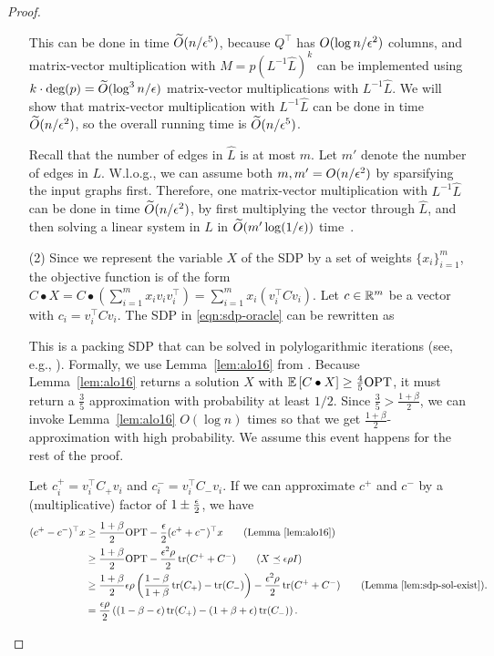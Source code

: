 \begin{proof}
\begin{enumerate}
This can be done in time $\widetilde O(n/\epsilon^5)$, because $Q^\top$ has $O(\log n/\epsilon^2)$ columns, and matrix-vector multiplication with $M = p(L^{-1} \hat L)^{k}$ can be implemented using $k \cdot \mbox{deg}(p) = \widetilde O(\log^3 n / \epsilon)$ matrix-vector multiplications with $L^{-1} \hat L$. We will show that matrix-vector multiplication with $L^{-1} \hat L$ can be done in time $\widetilde O(n / \epsilon^2)$, so the overall running time is $\widetilde O(n / \epsilon^5)$.

Recall that the number of edges in $\hat L$ is at most $m$.
Let $m'$ denote the number of edges in $L$.
W.l.o.g., we can assume both $m, m' = O(n/\epsilon^2)$ by sparsifying the input graphs first.
Therefore, one matrix-vector multiplication with $L^{-1} \hat L$ can be done in time $\widetilde O(n/\epsilon^2)$, by first multiplying the vector through $\hat L$, and then solving a linear system in $L$ in $\widetilde O(m' \log (1/\epsilon))$ time~\citep{SpielmanT14, KoutisMP11, KelnerOSZ13, PengS14, ChengCLPT15, CohenKMPPRX14, KyngS16}.

\item[(2)]
Since we represent the variable $X$ of the SDP by a set of weights $\{x_i\}_{i=1}^m$, the objective function is of the form $C \bullet X = C \bullet \left(\sum_{i=1}^m x_i v_i v_i^\top\right) = \sum_{i=1}^m x_i (v_i^\top C v_i)$.
Let $c \in \mathbb{R}^m$ be a vector with $c_i = v_i^\top C v_i$.
The SDP in \eqref{eqn:sdp-oracle} can be rewritten as
\begin{lp*}
\st {}
\end{lp*}

This is a packing SDP that can be solved in polylogarithmic iterations (see, e.g., \citep{JainY11, AllenLO16, PengTZ16}).
Formally, we use Lemma~\ref{lem:alo16} from \cite{AllenLO16}.
Because Lemma~\ref{lem:alo16} returns a solution $X$ with $\expect{}{C \bullet X} \ge \frac{4}{5} \mathrm{OPT}$, it must return a $\frac{3}{5}$ approximation with probability at least $1/2$.
Since $\frac{3}{5} > \frac{1+\beta}{2}$, we can invoke Lemma~\ref{lem:alo16} $O(\log n)$ times so that we get $\frac{1+\beta}{2}$-approximation with high probability. We assume this event happens for the rest of the proof.

Let $c_i^+ = v_i^\top C_+ v_i$ and $c_i^- = v_i^\top C_- v_i$.
If we can approximate $c^+$ and $c^-$ by a (multiplicative) factor of $1 \pm \frac{\epsilon}{2}$, we have
\begin{align*}
(c^+ - c^-)^\top x
& \ge \frac{1+\beta}{2} \mathrm{OPT} - \frac{\eps}{2} (c^+ + c^-)^\top x \tag{Lemma~\ref{lem:alo16}} \\
& \ge \frac{1+\beta}{2}  \mathrm{OPT} - \frac{\eps^2 \rho}{2} \tr(C^+ + C^-) \tag{$X \preceq \eps \rho I$} \\
& \ge \frac{1+\beta}{2} \eps \rho \left(\frac{1-\beta}{1+\beta}\tr(C_+) - \tr(C_-)\right) - \frac{\eps^2 \rho}{2} \tr(C^+ + C^-) \tag{Lemma~\ref{lem:sdp-sol-exist}}. \\
& = \frac{\eps \rho}{2} \left( (1-\beta-\eps) \tr(C_+) - (1+\beta+\eps) \tr(C_-) \right).
\end{align*}


\end{enumerate}
\end{proof}
